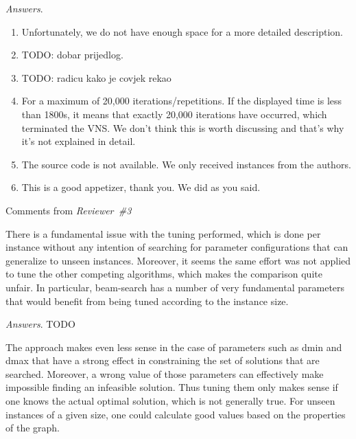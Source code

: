 \documentclass [11pt]{scrartcl}
\begin{document}
\emph{Answers}. 
\begin{enumerate}
	
\item Unfortunately, we do not have enough space for a more detailed description.
\item TODO: dobar prijedlog.
\item TODO: radicu kako je covjek rekao
\item For a maximum of 20,000 iterations/repetitions. If the displayed time is less than 1800s, it means that exactly 20,000 iterations have occurred, which terminated the VNS. We don't think this is worth discussing and that's why it's not explained in detail.
\item The source code is not available. We only received instances from the authors.
\item This is a good appetizer, thank you. We did as you said. 
 
\end{enumerate}

\begin{center} Comments from \textit{Reviewer\ \#3}
	
\end{center}


\begin{leftbar}
There is a fundamental issue with the tuning performed, which is done per instance without any intention of searching for parameter configurations that can generalize to unseen instances. Moreover, it seems the same effort was not applied to tune the other competing algorithms, which makes the comparison quite unfair. In particular, beam-search has a number of very fundamental parameters that would benefit from being tuned according to the instance size.	
\end{leftbar}

\emph{Answers}. TODO 


\begin{leftbar}
The approach makes even less sense in the case of parameters such as dmin and dmax that have a strong effect in constraining the set of solutions that are searched. Moreover, a wrong value of those parameters can effectively make impossible finding an infeasible solution. Thus tuning them only makes sense if one knows the actual optimal solution, which is not generally true. For unseen instances of a given size, one could calculate good values based on the properties of the graph.	
\end{leftbar}
\end{document}
